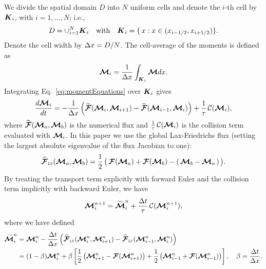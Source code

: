 We divide the spatial domain $D$ into $N$ uniform cells and denote the $i$-th cell by $\boldsymbol{K}_{i}$, with $i = 1,\ldots,N$; i.e.,
\begin{equation*}
  D = \cup_{i = 1}^{N} \boldsymbol{K}_{i} \quad \text{with} \quad
  \boldsymbol{K}_{i}=\{\,x : x\in(x_{i-1/2}, x_{i+1/2})\}.
\end{equation*}
Denote the cell width by $\Delta x = D/N$.  
The cell-average of the moments is defined as
\begin{equation}
  \boldsymbol{\mathcal{M}}_{i} = \dfrac{1}{\Delta x} \int_{\boldsymbol{K}_i}\boldsymbol{\mathcal{M}} dx.
\end{equation}
Integrating Eq.~\eqref{eq:momentEquations} over $\boldsymbol{K}_{i}$ gives
\begin{equation}
  \dfrac{d \bcM_{i}}{d t} = - \dfrac{1}{\dx} \left( \widehat{\bcF}(\bcM_{i},\bcM_{i+1}) -  \widehat{\bcF}(\bcM_{i-1},\bcM_{i})\right) + \f{1}{\tau}\,\cC(\bcM_{i}),
  \label{eq:SemiDiscretizatedMomentEquation}
\end{equation}
where $\widehat{\boldsymbol{\mathcal{F}}}(\boldsymbol{\mathcal{M}}_{a},\boldsymbol{\mathcal{M}}_{b})$ is the numerical flux and $\frac{1}{\tau}\,\mathcal{C}(\boldsymbol{\mathcal{M}}_{i})$ is the collision term evaluated with $\boldsymbol{\mathcal{M}}_{i}$.
In this paper we use the global Lax-Friedrichs flux (setting the largest absolute eigenvalue of the flux Jacobian to one):
\begin{equation}
  \widehat{\bcF}_{\LF}(\vect{\cM}_{a},\vect{\cM}_{b})
  =\f{1}{2}\,\big(\,\bcF(\vect{\cM}_{a})+\bcF(\vect{\cM}_{b})-(\,\vect{\cM}_{b}-\vect{\cM}_{a}\,)\,\big).
  \label{eq:Lax-Friedrichs flux}
\end{equation}
By treating the transport term explicitly with forward Euler and the collision term implicitly with backward Euler, we have
\begin{align}
  \bcM_{i}^{n+1} = \widetilde{\bcM}^{n}_{i} + \f{\dt}{\tau}\,\cC(\bcM^{n+1}_{i}),
  \label{eq:MomentIMEX}
\end{align}
where we have defined
\begin{align}
  \widetilde{\bcM}^{n}_{i} 
  & = \bcM_{i}^{n} - \frac{\dt}{\dx} \left( \widehat{\bcF}_{\LF}(\bcM^{n}_{i},\bcM^{n}_{i+1}) -  \widehat{\bcF}_{\LF}(\bcM^{n}_{i-1},\bcM^{n}_{i})\right)\nonumber \\
  & = (1-\beta)\bcM_{i}^{n} + \beta\left[ \f{1}{2}\left( \bcM^{n}_{i+1}-\bcF(\bcM^{n}_{i+1})\right)  + \f{1}{2}\left( \bcM^{n}_{i-1}+\bcF(\bcM^{n}_{i-1})\right)\right],
  \quad\beta = \frac{\dt}{\dx}.  
\label{eq:widetildeM}
\end{align}

